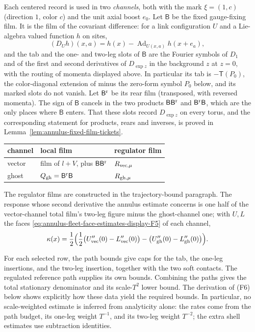 Each centered record is used in two \emph{channels}, both with the mark
$\xi=(1,c)$ (direction $1$, color $c$) and the unit axial boost $e_0$.
Let $\mathsf B$ be the fixed gauge-fixing film. It is the film of the
covariant difference: for a link configuration $U$ and a
Lie-algebra valued function $h$ on sites,
\[
 (D_Uh)(x,a)=h(x)-\operatorname{Ad}_{U(x,a)}h(x+e_a),
\]
and the tab and the one- and two-leg slots of $\mathsf B$ are the
Fourier symbols of $D_1$ and of the first and second derivatives of
$D_{\exp z}$ in the background $z$ at $z=0$, with the routing of
momenta displayed above. In particular its tab is
$-\mathsf T(P_0)$, the color-diagonal extension of minus the zero-form
symbol $P_0$ below, and its marked slots do not vanish. Let
$\mathsf B^{\rm r}$ be its rear film (transposed, with reversed
momenta). The sign of $\mathsf B$ cancels in the two products
$\mathsf B\mathsf B^{\rm r}$ and $\mathsf B^{\rm r}\mathsf B$, which are
the only places where $\mathsf B$ enters. That these slots record
$D_{\exp z}$ on every torus, and the corresponding statement for
products, rears and inverses, is proved in
Lemma~\ref{lem:annulus-fixed-film-tickets}.
\begin{center}
\begin{tabular}{l|l|l}
 channel & local film & regulator film\\ \hline
 vector & film of $l+V$, plus $\mathsf B\mathsf B^{\rm r}$ &
   $R_{\rm vec,\mu}$\\
 ghost & $Q_{\rm gh}=\mathsf B^{\rm r}\mathsf B$ & $R_{\rm gh,\mu}$
\end{tabular}
\end{center}
The regulator films are constructed in the trajectory-bound paragraph.
The response whose second derivative the annulus estimate concerns is
one half of the vector-channel total film's two-leg figure minus the
ghost-channel one; with $U,L$ the faces \eqref{eq:annulus-fleet-face-estimates-display-F5} of each channel,
\begin{equation}\label{eq:ex-fleet-response}
 \kappa(x)=\frac12\Bigl(\frac12\bigl(U_{\rm vec}''(0)-L_{\rm vec}''(0)\bigr)
           -\bigl(U_{\rm gh}''(0)-L_{\rm gh}''(0)\bigr)\Bigr).
\end{equation}

For each selected row, the path bounds give caps for the tab, the
one-leg insertions, and the two-leg insertion, together with the two
soft contacts. The regulated reference path supplies its own bounds.
Combining the paths gives the total stationary denominator and its
scale-$T^2$ lower bound. The derivation of (F6) below shows explicitly
how these data yield the required bounds. In particular, no
scale-weighted estimate is inferred from analyticity alone: the rates
come from the path budget, its one-leg weight $T^{-1}$, and its two-leg
weight $T^{-2}$; the extra shell estimates use subtraction identities.

